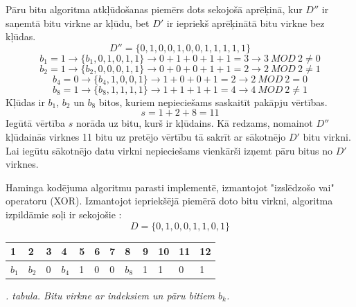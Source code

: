 \documentclass[12pt, a4paper, oneside, openright]{article}
\renewcommand{\thectables}{\arabic{ctables}}
\begin{document}
\par 
Pāru bitu algoritma atkļūdošanas piemērs dots sekojošā aprēķinā, kur $D''$ ir saņemtā bitu
virkne ar kļūdu, bet $D'$ ir iepriekš aprēķinātā bitu virkne bez kļūdas.
$$
D'' = \{0,1,0,0,1,0,0,1,1,1,1,1\} 
$$
$$
b_1 = 1 \rightarrow \{b_1,0,1,0,1,1\} \rightarrow 0 + 1 + 0 + 1 + 1 = 3 \rightarrow 3\ MOD\ 2 \neq 0
$$
$$
b_2 = 1 \rightarrow \{b_2,0,0,0,1,1\} \rightarrow 0 + 0 + 0 + 1 + 1 = 2 \rightarrow 2\ MOD\ 2 \neq 1
$$
$$
b_4 = 0 \rightarrow \{b_4,1,0,0,1\} \rightarrow 1 + 0 + 0 + 1 = 2 \rightarrow 2\ MOD\ 2 = 0
$$
$$
b_8 = 1 \rightarrow \{b_8,1,1,1,1\} \rightarrow 1 + 1 + 1 + 1 = 4 \rightarrow 4\ MOD\ 2 \neq 1
$$
Kļūdas ir $b_1$, $b_2$ un $b_8$ bitos, kuriem nepieciešams saskaitīt pakāpju vērtības.
$$
s = 1 + 2 + 8 = 11
$$
Iegūtā vērtība $s$ norāda uz bitu, kurš ir kļūdains. Kā redzams, nomainot $D''$ kļūdainās virknes 11 bitu uz
pretējo vērtību tā sakrīt ar sākotnējo $D'$ bitu virkni.
Lai iegūtu sākotnējo datu virkni nepieciešams vienkārši izņemt pāru bitus no $D'$ virknes.

\newpage
\par
Haminga kodējuma algoritmu parasti implementē, izmantojot "izslēdzošo vai" operatoru (XOR).
Izmantojot iepriekšējā piemērā doto bitu virkni, algoritma izpildāmie soļi ir sekojošie \cite{HenryS.Warren2012}:
$$
D = \{0,1,0,0,1,1,0,1\} 
$$

\begin{samepage}
\vspace{-0.5cm}
\begin{table}[h]
\centering
\begin{tabular}{|l|l|l|l|l|l|l|l|l|l|l|l|}
\hline
1 & 2 & 3 & 4 & \cellcolor[HTML]{77FF77}5 & 6 & 7 & 8 & \cellcolor[HTML]{77FF77}9 & \cellcolor[HTML]{77FF77}10 & 11 & \cellcolor[HTML]{77FF77}12 \\ \hline
\cellcolor[HTML]{FFFFC7}$b_1$  & \cellcolor[HTML]{FFFFC7}$b_2$  & 0 & \cellcolor[HTML]{FFFFC7}$b_4$  & \cellcolor[HTML]{77FF77}1 & 0 & 0 & \cellcolor[HTML]{FFFFC7}$b_8$  & \cellcolor[HTML]{77FF77}1 & \cellcolor[HTML]{77FF77}1  & 0  & \cellcolor[HTML]{77FF77}1  \\ \hline
\end{tabular}
\end{table}
\vspace{-0.5cm}
\label{ctables:hamming_1}
\begin{center}
\footnotesize{
\textit{\thectables. tabula. Bitu virkne ar indeksiem un pāru bitiem $b_k$.}}
\end{center}
\end{samepage}
\end{document}
